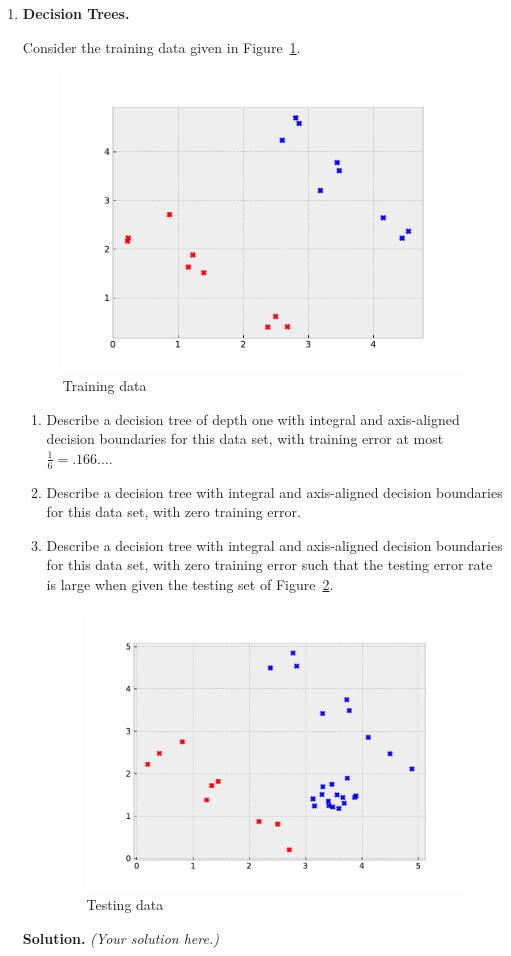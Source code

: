 \documentclass{article}
\theoremstyle{definition}
\theoremstyle{remark}
\newenvironment{Q}
        {%
          \clearpage
          \item
        }
        {%
          \phantom{s} %
          \bigskip
          \textbf{Solution.}
        }
\begin{document}
        \begin{enumerate}
          \begin{Q}
            \textbf{Decision Trees.}

              Consider the training data given in Figure~\ref{fig:p1 training set}.
              \begin{figure}[h]
                \centering
                \includegraphics[width=0.6\linewidth]{figures/training.pdf}
                \caption{Training data}
                \label{fig:p1 training set}
              \end{figure}
            \begin{enumerate}
              \item Describe a decision tree of depth one with integral and axis-aligned decision boundaries for this data set, with training error at most $\frac 1 6 = .166\dots$.
              \item Describe a decision tree with integral and axis-aligned decision boundaries for this data set, with zero training error.
              \item Describe a decision tree with integral and axis-aligned decision boundaries for this data set, with zero training error such that the testing error rate is large when given the testing set of Figure~\ref{fig:p1 testing set}.
              \begin{figure}[h]
                \centering
                \includegraphics[width=0.6\linewidth]{figures/testing.pdf}
                \caption{Testing data}
                \label{fig:p1 testing set}
              \end{figure}
            \end{enumerate}
          \end{Q}
          \emph{(Your solution here.)}



\end{enumerate}
\end{document}

